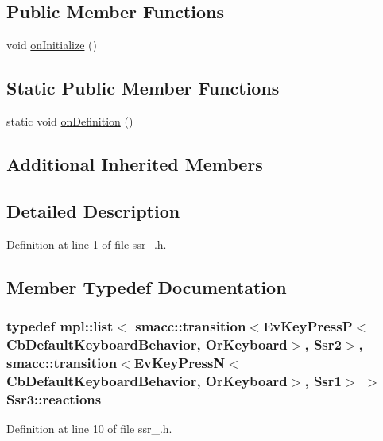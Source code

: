 \subsection*{Public Member Functions}
\begin{DoxyCompactItemize}
\item 
void \hyperlink{structSsr3_aa20ad5030a625d39522d559ebe75feb0}{on\+Initialize} ()
\end{DoxyCompactItemize}
\subsection*{Static Public Member Functions}
\begin{DoxyCompactItemize}
\item 
static void \hyperlink{structSsr3_a57a64c1b26c2967aff8f55077f0b2553}{on\+Definition} ()
\end{DoxyCompactItemize}
\subsection*{Additional Inherited Members}


\subsection{Detailed Description}


Definition at line 1 of file ssr\+\_.\+h.



\subsection{Member Typedef Documentation}
\subsubsection[{\texorpdfstring{reactions}{reactions}}]{\setlength{\rightskip}{0pt plus 5cm}typedef mpl\+::list$<$ {\bf smacc\+::transition}$<$Ev\+Key\+PressP$<$Cb\+Default\+Keyboard\+Behavior, Or\+Keyboard$>$, {\bf Ssr2}$>$, {\bf smacc\+::transition}$<$Ev\+Key\+PressN$<$Cb\+Default\+Keyboard\+Behavior, Or\+Keyboard$>$, {\bf Ssr1}$>$ $>$ {\bf Ssr3\+::reactions}}\hypertarget{structSsr3_a5d42cce5df84cb4f58bda69736786927}{}\label{structSsr3_a5d42cce5df84cb4f58bda69736786927}


Definition at line 10 of file ssr\+\_.\+h.



